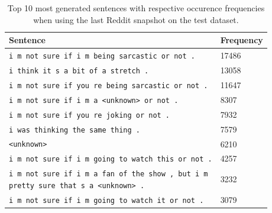 \begin{table}[H]
	\centering
	\begin{adjustbox}{max width=\textwidth}
		\begin{tabular}{ll}
			\toprule
			Sentence & Frequency\\ \midrule
			\texttt{i m not sure if i m being sarcastic or not .} & 17486\\
			\texttt{i think it s a bit of a stretch .} & 13058\\
			\texttt{i m not sure if you re being sarcastic or not .} & 11647\\
			\texttt{i m not sure if i m a <unknown> or not .} & 8307\\
			\texttt{i m not sure if you re joking or not .} & 7932\\
			\texttt{i was thinking the same thing .} & 7579\\
			\texttt{<unknown>} & 6210\\
			\texttt{i m not sure if i m going to watch this or not .} & 4257\\
			\specialcell{\texttt{i m not sure if i m a fan of the show , but i m}\\\texttt{pretty sure that s a <unknown> .}} & 3232\\
			\texttt{i m not sure if i m going to watch it or not .} & 3079\\
			\bottomrule
		\end{tabular}
	\end{adjustbox}
	\caption{Top 10 most generated sentences with respective occurence frequencies when using the last Reddit snapshot on the test dataset.}
	\label{results:test_performance:reddit_sample_outputs}
\end{table}


